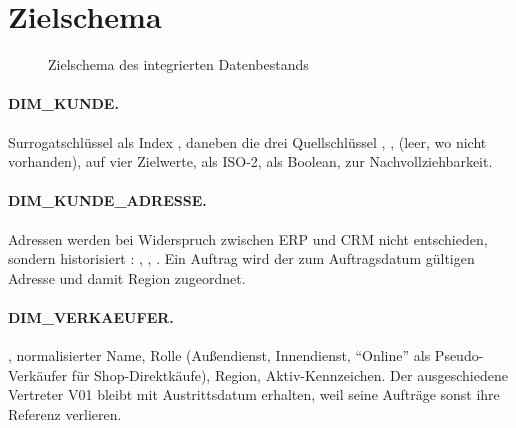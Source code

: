 \section{Zielschema}\label{sec:zielschema}



\begin{figure}[H]
  \centering
  \caption{Zielschema des integrierten Datenbestands}
  \label{fig:zielschema}
\end{figure}

\paragraph{DIM\_KUNDE.} Surrogatschlüssel  als Index , daneben die drei Quellschlüssel , ,  (leer, wo nicht vorhanden),  auf vier Zielwerte,  als ISO-2,  als Boolean,  zur Nachvollziehbarkeit.

\paragraph{DIM\_KUNDE\_ADRESSE.} Adressen werden bei Widerspruch zwischen ERP und CRM nicht entschieden, sondern historisiert : , , . Ein Auftrag wird der zum Auftragsdatum gültigen Adresse und damit Region zugeordnet. 

\paragraph{DIM\_VERKAEUFER.} , normalisierter Name, Rolle (Außendienst, Innendienst, \enquote{Online} als Pseudo-Verkäufer für Shop-Direktkäufe), Region, Aktiv-Kennzeichen. Der ausgeschiedene Vertreter V01 bleibt mit Austrittsdatum erhalten, weil seine Aufträge sonst ihre Referenz verlieren.

